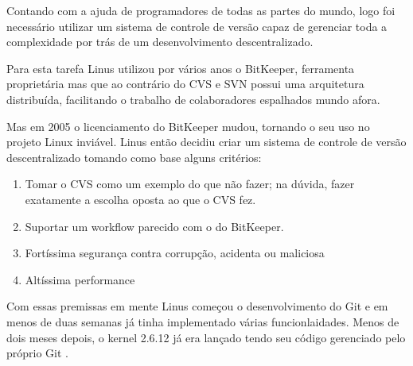 Contando com a ajuda de programadores de todas as partes do mundo, logo
foi necessário utilizar um sistema de controle de versão capaz de gerenciar
toda a complexidade por trás de um desenvolvimento descentralizado.

Para esta tarefa Linus utilizou por vários anos o BitKeeper, ferramenta
proprietária mas que ao contrário do CVS e SVN possui uma arquitetura distribuída,
facilitando o trabalho de colaboradores espalhados mundo afora.

Mas em 2005 o licenciamento do BitKeeper mudou, tornando o seu uso no
projeto Linux inviável. Linus então decidiu criar um sistema de controle
de versão descentralizado tomando como base alguns critérios:

\begin{enumerate}

\item Tomar o CVS como  um exemplo do que não fazer; na dúvida, fazer exatamente
a escolha oposta ao que o CVS fez.

\item Suportar um workflow parecido com o do BitKeeper.

\item Fortíssima segurança contra corrupção, acidenta ou maliciosa

\item Altíssima performance

\end{enumerate}

Com essas premissas em mente Linus começou o desenvolvimento do Git e em menos de duas semanas já tinha implementado várias funcionlaidades. Menos de dois meses depois, o kernel 2.6.12 já era lançado tendo seu código gerenciado pelo próprio Git \cite{Chacon}.


